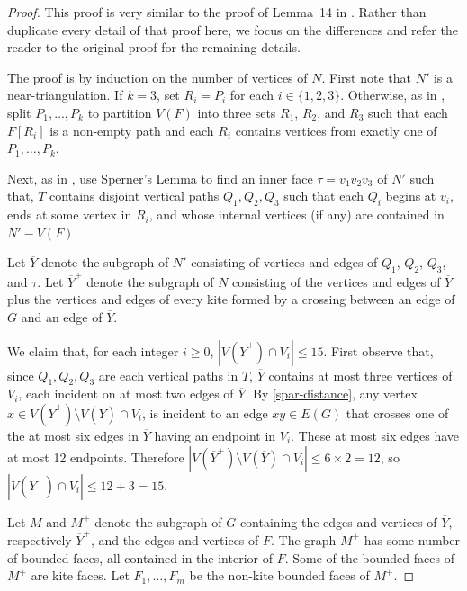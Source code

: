 \documentclass{patmorin}
\begin{document}
\begin{proof}
  This proof is very similar to the proof of Lemma~14 in \citet{dujmovic.joret.ea:planar}. Rather than duplicate every detail of that proof here, we focus on the differences and refer the reader to the original proof for the remaining details.
  
  The proof is by induction on the number of vertices of $N$.
  First note that $N'$ is a near-triangulation.  If $k=3$, set $R_i=P_i$ for each $i\in\{1,2,3\}$.  Otherwise, as in \citet{dujmovic.joret.ea:planar}, split $P_1,\ldots,P_k$ to partition $V(F)$ into three sets $R_1$, $R_2$, and $R_3$ such that each $F[R_i]$ is a non-empty path and each $R_i$ contains vertices from exactly one of $P_1,\ldots,P_k$. 
  
  Next, as in \citet{dujmovic.joret.ea:planar}, use Sperner's Lemma to find an inner face $\tau=v_1v_2v_3$ of $N'$ such that, $T$ contains disjoint vertical paths $Q_1,Q_2,Q_3$ such that each $Q_i$ begins at $v_i$, ends at some vertex in $R_i$, and whose internal vertices (if any) are contained in $N'-V(F)$.
  
  Let $\overline{Y}$ denote the subgraph of $N'$ consisting of vertices and edges of $Q_1$, $Q_2$, $Q_3$, and $\tau$.  Let $\overline{Y}^+$ denote the subgraph of $N$ consisting of the vertices and edges of $\overline{Y}$ plus the vertices and edges of every kite formed by a crossing between an edge of $G$ and an edge of $\overline{Y}$.
  
  We claim that, for each integer $i\ge 0$, $|V(\overline{Y}^+)\cap V_i|\le 15$.  First observe that, since $Q_1,Q_2,Q_3$ are each vertical paths in $T$,  $\overline{Y}$ contains at most three vertices of $V_i$, each incident on at most two edges of $\overline{Y}$.  By \eqref{spar-distance}, any vertex $x\in V(\overline{Y}^+)\setminus V(\overline{Y})\cap V_i$, is incident to an edge $xy\in E(G)$ that crosses one of the at most six edges in $\overline{Y}$ having an endpoint in $V_i$.  These at most six edges have at most 12 endpoints.  Therefore $|V(\overline{Y}^+)\setminus V(\overline{Y})\cap V_i|\le 6\times 2=12$, so $|V(\overline{Y}^+)\cap V_i|\le 12+3=15$.
  
  Let $M$ and $M^+$ denote the subgraph of $G$ containing the edges and vertices of $\overline{Y}$, respectively $\overline{Y}^+$, and the edges and vertices of $F$.  The graph $M^+$ has some number of bounded faces, all contained in the interior of $F$. Some of the bounded faces of $M^+$ are kite faces. Let $F_1,\ldots,F_m$ be the non-kite bounded faces of $M^+$.  
  

\end{proof}
\end{document}
